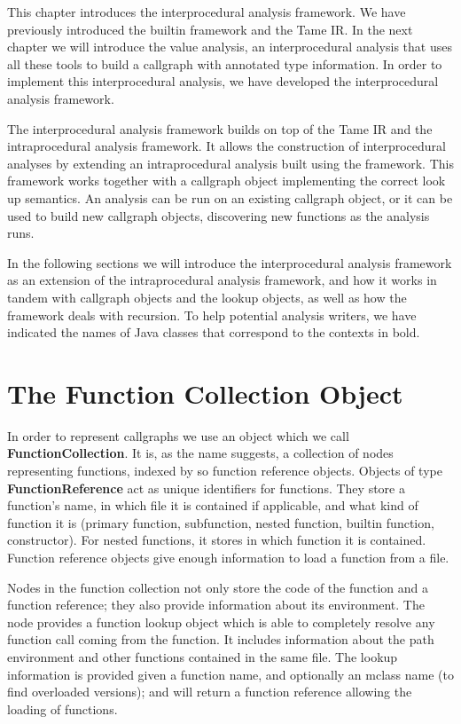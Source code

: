 This chapter introduces the interprocedural analysis framework.
We have previously introduced the builtin framework and the
Tame IR. In the next chapter we will introduce the value analysis,
an interprocedural analysis that uses all these tools to build
a callgraph with annotated type information. In order to implement
this interprocedural analysis, we have developed the 
interprocedural analysis framework.

The interprocedural analysis framework builds on top of the
Tame IR and the \mcsaf intraprocedural analysis framework. It allows
the construction of interprocedural analyses by extending an
intraprocedural analysis built using the \mcsaf framework. This
framework works together with a callgraph object implementing the
correct \matlab look up semantics. An analysis can be run on an
existing callgraph object, or it can be used to build new callgraph
objects, discovering new functions as the analysis runs.

In the following sections we will introduce the interprocedural
analysis framework as an extension of the intraprocedural analysis
framework, and how it works in tandem with callgraph objects and the
lookup objects, as well as how the framework deals with recursion. To
help potential analysis writers, we have indicated the names of Java
classes that correspond to the contexts in bold.


\section{The Function Collection Object}

In order to represent callgraphs we use an object which we call
\textbf{FunctionCollection}. It is, as the name suggests, a collection
of nodes representing functions, indexed by so function
reference objects. Objects of type \textbf{FunctionReference} 
act as unique identifiers for functions. They store a function's
name, in which file it is contained if applicable, and what kind
of function it is (primary function, subfunction, nested function,
builtin function, constructor). For nested functions, it stores
in which function it is contained. Function reference objects
give enough information to load a function from a file.

Nodes in the function collection not only store the code of the
function and a function reference; they also provide information
about its environment. The node provides a \matlab function lookup
object which is able to completely resolve any function call
coming from the function. It includes information about the 
\matlab path environment and other functions contained in the same file.
The lookup information is provided given a function name, and optionally
an mclass name (to find overloaded versions); and will return
a function reference allowing the loading of functions.

